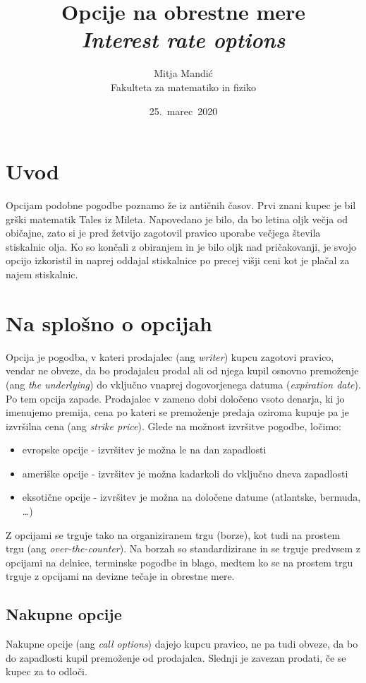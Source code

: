 \documentclass[a4paper]{article}
\title{Opcije na obrestne mere\\
    \textit{Interest rate options}}
\author{Mitja Mandić \\ Fakulteta za matematiko in fiziko}
\date{25.\ marec\ 2020}
\begin{document}
\maketitle

\pagebreak

\begin{abstract}

\end{abstract}
\pagebreak

\section{Uvod}
Opcijam podobne pogodbe poznamo že iz antičnih časov. Prvi znani kupec je bil grški matematik Tales iz Mileta.
Napovedano je bilo, da bo letina oljk večja od običajne, zato si je pred žetvijo zagotovil pravico uporabe večjega
števila stiskalnic olja. Ko so končali z obiranjem in je bilo oljk nad pričakovanji, je svojo opcijo izkoristil in naprej oddajal
stiskalnice po precej višji ceni kot je plačal za najem stiskalnic.

\section{Na splošno o opcijah}
Opcija je pogodba, v kateri prodajalec (ang \textit{writer}) kupcu zagotovi pravico, vendar ne obveze, da bo prodajalcu prodal
ali od njega kupil osnovno premoženje (ang \textit{the underlying}) do vključno vnaprej dogovorjenega datuma (\textit{expiration date}). Po tem opcija zapade.
Prodajalec v zameno dobi določeno vsoto denarja, ki jo imenujemo premija, cena po kateri se premoženje predaja oziroma kupuje
pa je izvršilna cena (ang \textit{strike price}). Glede na možnost izvršitve pogodbe, ločimo:
\begin{itemize}
    \item evropske opcije - izvršitev je možna le na dan zapadlosti
    \item ameriške opcije - izvršitev je možna kadarkoli do vključno dneva zapadlosti
    \item eksotične opcije - izvršitev je možna na določene datume (atlantske, bermuda, \ldots)
\end{itemize}
Z opcijami se trguje tako na organiziranem trgu (borze), kot tudi na prostem trgu (ang \textit{over-the-counter}). Na borzah so
standardizirane in se trguje predvsem z opcijami na delnice, terminske pogodbe in blago, medtem ko se na prostem trgu trguje z opcijami
na devizne tečaje in obrestne mere.


\subsection{Nakupne opcije}
Nakupne opcije (ang \textit{call options}) dajejo kupcu pravico, ne pa tudi obveze, da bo do zapadlosti kupil premoženje od prodajalca.
Slednji je zavezan prodati, če se kupec za to odloči. 
\end{document}
